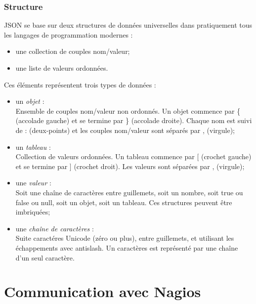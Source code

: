 \subsubsection{Structure}

JSON se base sur deux structures de donn\'ees universelles dans pratiquement tous les langages de programmation modernes :

\begin{itemize}
	\item une collection de couples nom/valeur;
	\item une liste de valeurs ordonn\'ees.

\end{itemize}

\vspace{0.20cm}

\noindent Ces \'el\'ements repr\'esentent trois types de donn\'ees :

\begin{itemize}
	\item un \textit{objet} :\\Ensemble de couples nom/valeur non ordonn\'es. Un objet commence par \textsf{\{ (accolade gauche)} et se termine par \textsf{\} (accolade droite)}.
	Chaque nom est suivi de \textsf{: (deux-points)} et les couples nom/valeur sont s\'epar\'es par \textsf{, (virgule)};
	\item un \textit{tableau} :\\Collection de valeurs ordonn\'ees. Un tableau commence par \textsf{$[$ (crochet gauche)} et se termine par \textsf{$]$ (crochet droit)}.
	Les valeurs sont s\'epar\'ees par \textsf{, (virgule)};
	\item une \textit{valeur} :\\Soit une \textsf{cha\^ine de caract\`eres} entre guillemets, soit un \textsf{nombre}, soit \textsf{true} ou \textsf{false} ou \textsf{null}, soit un \textsf{objet}, soit un \textsf{tableau}.
	Ces structures peuvent \^etre imbriqu\'ees;
	\item une \textit{cha\^ine de caract\`eres} :\\Suite caract\'eres Unicode (z\'ero ou plus), entre guillemets, et utilisant les \'echappements avec antislash. 
	Un caract\`eres est repr\'esent\'e par une cha\^ine d'un seul caract\`ere.

\end{itemize}

\section{Communication avec Nagios}

